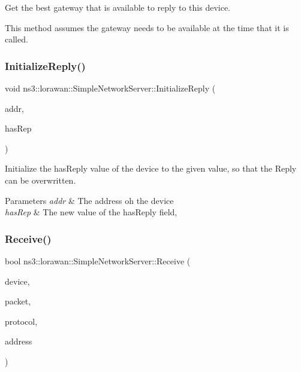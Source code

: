 Get the best gateway that is available to reply to this device.

This method assumes the gateway needs to be available at the time that it is called. \mbox{\label{classns3_1_1lorawan_1_1SimpleNetworkServer_a64d56f6364faa25617b28f77dbb659ee}} 
\subsubsection{\texorpdfstring{Initialize\+Reply()}{InitializeReply()}}
{\footnotesize\ttfamily void ns3\+::lorawan\+::\+Simple\+Network\+Server\+::\+Initialize\+Reply (\begin{DoxyParamCaption}\item[{\hyperlink{classns3_1_1lorawan_1_1LoraDeviceAddress}{Lora\+Device\+Address}}]{addr,  }\item[{bool}]{has\+Rep }\end{DoxyParamCaption})}

Initialize the has\+Reply value of the device to the given value, so that the Reply can be overwritten.


\begin{DoxyParams}{Parameters}
{\em addr} & The address oh the device \\
\hline
{\em has\+Rep} & The new value of the has\+Reply field, \\
\hline
\end{DoxyParams}
\mbox{\label{classns3_1_1lorawan_1_1SimpleNetworkServer_a0cfe7b758c095ac9bc87af7c856990ac}} 
\subsubsection{\texorpdfstring{Receive()}{Receive()}}
{\footnotesize\ttfamily bool ns3\+::lorawan\+::\+Simple\+Network\+Server\+::\+Receive (\begin{DoxyParamCaption}\item[{Ptr$<$ \hyperlink{classNetDevice}{Net\+Device} $>$}]{device,  }\item[{Ptr$<$ const Packet $>$}]{packet,  }\item[{uint16\+\_\+t}]{protocol,  }\item[{const Address \&}]{address }\end{DoxyParamCaption})}

